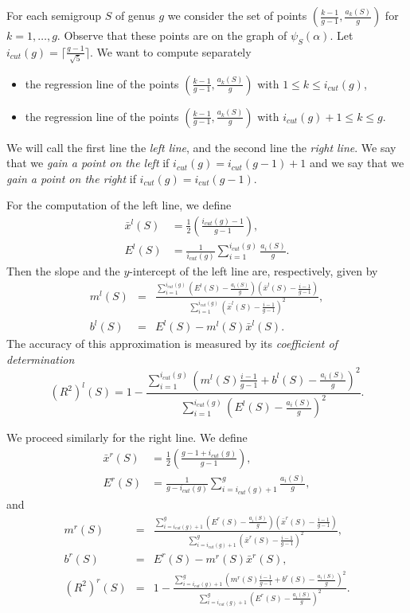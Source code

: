 \documentclass[12pt]{amsart}
\begin{document}
For each semigroup $S$ of genus $g$ we consider the set of points $(\frac{k-1}{g-1},\frac{a_k(S)}{g})$
for $k=1,\ldots,g$. Observe that these points are on the graph of $\psi_S(\alpha)$.
Let $i_{cut}(g)=\lceil\frac{g-1}{\sqrt{5}}\rceil$.
We want to compute separately
\begin{itemize}
\item  the regression line of the points $(\frac{k-1}{g-1},\frac{a_k(S)}{g})$ with $1\leq k\leq i_{cut}(g)$,
\item  the regression line of the points $(\frac{k-1}{g-1},\frac{a_k(S)}{g})$ with $i_{cut}(g)+1\leq k\leq g$.
\end{itemize}
We will call the first line the \emph{left line}, and the second line the \emph{right line}.
We say that we \emph{gain a point on the left} if $i_{cut}(g)=i_{cut}(g-1)+1$ and we say that we \emph{gain a point on the right} if $i_{cut}(g)=i_{cut}(g-1)$.
  
For the computation of the left line, we define
\begin{align*}
\bar x^l(S)& =\frac{1}{2}\left(\frac{i_{cut}(g)-1}{g-1}\right), \\
E^l(S)& =\frac{1}{i_{cut}(g)}\sum_{i=1}^{i_{cut}(g)}\frac{a_i(S)}{g}.
\end{align*}
Then the slope and the $y$-intercept of the left line are, respectively, given by
\begin{eqnarray*}
m^l(S)&=&\frac{\sum_{i=1}^{i_{cut}(g)}\left(E^l(S)-\frac{a_i(S)}{g}\right)\left(\bar x^l(S)-\frac{i-1}{g-1}\right)}{\sum_{i=1}^{i_{cut}(g)}\left(\bar x^l(S)-\frac{i-1}{g-1}\right)^2},\\  
  b^l(S)&=&E^l(S)-m^l(S)\bar x^l(S).
  \end{eqnarray*}
The accuracy of this approximation is measured by its \emph{coefficient of determination}
  $$(R^2)^l(S)=1-\frac{\sum_{i=1}^{i_{cut}(g)}\left(m^l(S)\frac{i-1}{g-1}+b^l(S)-\frac{a_i(S)}{g}\right)^2}{\sum_{i=1}^{i_{cut}(g)}\left(E^l(S)-\frac{a_i(S)}{g}\right)^2}.$$
  
We proceed similarly for the right line.  We define 
\begin{align*}
\bar x^r(S)& =\frac{1}{2}\left(\frac{g-1+i_{cut}(g)}{g-1}\right),\\
E^r(S) &=\frac{1}{g-i_{cut}(g)}\sum_{i=i_{cut}(g)+1}^{g}\frac{a_i(S)}{g},
\end{align*}
and
\begin{eqnarray*}
  m^r(S)&=&\frac{\sum_{i=i_{cut}(g)+1}^{g}\left(E^r(S)-\frac{a_i(S)}{g}\right)\left(\bar x^r(S)-\frac{i-1}{g-1}\right)}{\sum_{i=i_{cut}(g)+1}^{g}\left(\bar x^r(S)-\frac{i-1}{g-1}\right)^2},\\
  b^r(S)&=&E^r(S)-m^r(S)\bar x^r(S),\\
  (R^2)^r(S)&=&1-\frac{\sum_{i=i_{cut}(g)+1}^{g}\left(m^r(S)\frac{i-1}{g-1}+b^r(S)-\frac{a_i(S)}{g}\right)^2}{\sum_{i=i_{cut}(g)+1}^{g}\left(E^r(S)-\frac{a_i(S)}{g}\right)^2}.
\end{eqnarray*}
\end{document}
